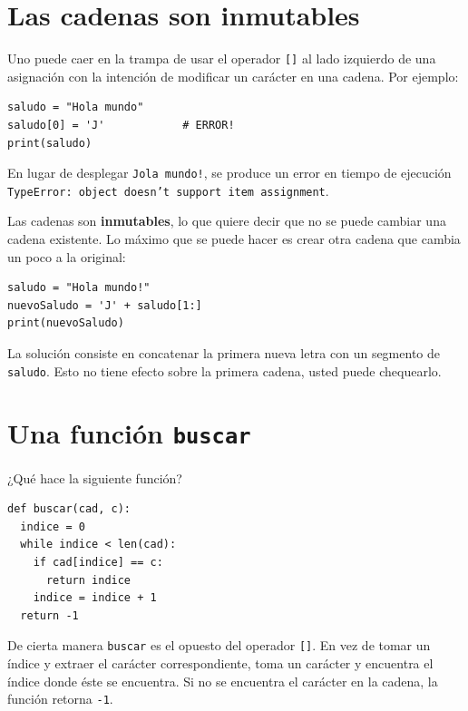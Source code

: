 \section{Las cadenas son inmutables}

  

Uno puede caer en la trampa de usar el operador \texttt{{[}{]}} al
lado izquierdo de una asignación con la intención de modificar un
carácter en una cadena. Por ejemplo:
\begin{verbatim}
saludo = "Hola mundo"
saludo[0] = 'J'            # ERROR!
print(saludo)
\end{verbatim}
 En lugar de desplegar \texttt{Jola mundo!}, se produce un error en
tiempo de ejecución \texttt{TypeError: object doesn't support item
assignment}.


Las cadenas son \textbf{inmutables}, lo que quiere decir que no se
puede cambiar una cadena existente. Lo máximo que se puede hacer es
crear otra cadena que cambia un poco a la original:
\begin{verbatim}
saludo = "Hola mundo!"
nuevoSaludo = 'J' + saludo[1:]
print(nuevoSaludo)
\end{verbatim}

La solución consiste en concatenar la primera nueva letra con un segmento
de \texttt{saludo}. Esto no tiene efecto sobre la primera cadena,
usted puede chequearlo.


\section{Una función \texttt{buscar} }

\label{find}   

¿Qué hace la siguiente función?

\begin{verbatim}
def buscar(cad, c):
  indice = 0
  while indice < len(cad):
    if cad[indice] == c:
      return indice
    indice = indice + 1
  return -1
\end{verbatim}
 De cierta manera \texttt{buscar} es el opuesto del operador \texttt{{[}{]}}.
En vez de tomar un índice y extraer el carácter correspondiente, toma
un carácter y encuentra el índice donde éste se encuentra. Si no se
encuentra el carácter en la cadena, la función retorna \texttt{-1}.

